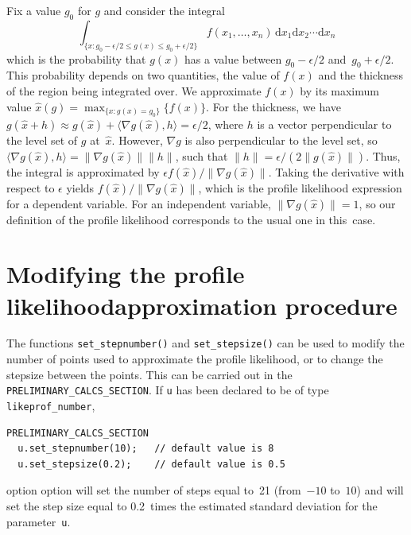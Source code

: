 \documentclass{admbmanual}
\newcommand\PCS{\texttt{PRELIMINARY\_CALCS\_SECTION}}
\newcommand\apl{profile likelihood}
\begin{document}
Fix a value $g_0$ for $g$ and consider the integral
$$\int_{\{x:g_0-\epsilon/2\le g(x)\le g_0+\epsilon/2\}} f(x_1,\ldots, x_n)
\,\textrm{d}x_1\textrm{d}x_2\cdots \textrm{d}x_n$$
which is the probability that $g(x)$ has a value between $g_0-\epsilon/2$
and~$g_0+\epsilon/2$. This probability depends on two quantities, the value of
$f(x)$ and the thickness of the region being integrated over. We approximate
$f(x)$ by its maximum value $\hat x(g)=\max_{\{x:g(x)=g_0\}} \{f(x)\}$. For the
thickness, we have $g(\hat x+h)\approx g(\hat x)+\langle\nabla g(\hat
x),h\rangle=\epsilon/2$, where $h$ is a vector perpendicular to the level set of
$g$ at~$\hat x$. However, $\nabla g$ is also perpendicular to the level set, so
$\langle\nabla g(\hat x),h\rangle=\|\nabla g(\hat x)\| \|h\|$, such that $
\|h\|=\epsilon/(2\|g(\hat x)\|)$. Thus, the integral is approximated by
$\epsilon f(\hat x)/\|\nabla g(\hat x)\|$. Taking the derivative with respect to
$\epsilon$ yields $f(\hat x)/\|\nabla g(\hat x)\|$, which is the profile
likelihood expression for a dependent variable. For an independent variable,
$\|\nabla g(\hat x)\|=1$, so our definition of the profile likelihood
corresponds to the usual one in this~case.

\section{Modifying the profile likelihood\br approximation procedure}

The functions \texttt{set\_stepnumber()} and \texttt{set\_stepsize()} can be
used to modify the number of points used to approximate the \apl, or to change
the stepsize between the points. This can be carried out in the \PCS. If
\texttt{u} has been declared to be of type \texttt{likeprof\_number},
\begin{lstlisting}
PRELIMINARY_CALCS_SECTION
  u.set_stepnumber(10);   // default value is 8
  u.set_stepsize(0.2);    // default value is 0.5
\end{lstlisting}
 { option}
 { option}
will set the number of steps equal to~21 (from~$-10$ to~$10$) and will set the
step size equal to 0.2~times the estimated standard deviation for the
parameter~\texttt{u}.
\end{document}
